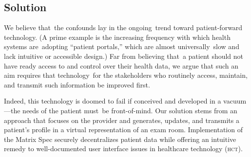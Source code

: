 \subsection{Solution}
We believe that the confounds lay in the ongoing trend toward patient-forward technology. (A prime example is the increasing frequency with which health systems are adopting ``patient portals,'' which are almost universally slow and lack intuitive or accessible design.) Far from believing that a patient should not have ready access to and control over their health data, we argue that such an aim requires that technology for the stakeholders who routinely access, maintain, and transmit such information be improved first.%

Indeed, this technology is doomed to fail if conceived and developed in a vacuum---the needs of the patient must be front-of-mind. Our solution stems from an approach that focuses on the provider and generates, updates, and transmits a patient's profile in a virtual representation of an exam room. Implementation of the Matrix Spec securely decentralizes patient data while offering an intuitive remedy to well-documented user interface issues in healthcare technology (\textsc{hct}).%
